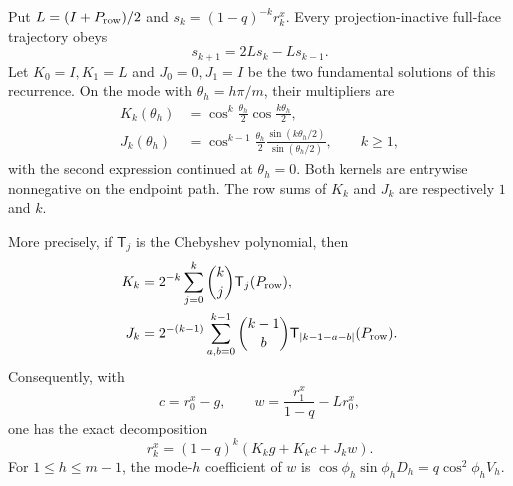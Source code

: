 \begin{lemma}
\label{lem:terminal-modal-propagators}
Put $L=(I+P_{\rm row})/2$ and
$s_k=(1-q)^{-k}r_k^x$.  Every projection-inactive full-face trajectory obeys
\begin{equation}
 s_{k+1}=2Ls_k-Ls_{k-1}.
 \label{eq:terminal-modal-scaled-recurrence}
\end{equation}
Let $K_0=I,K_1=L$ and $J_0=0,J_1=I$ be the two fundamental solutions of
this recurrence.  On the mode with $\theta_h=h\pi/m$, their multipliers are
\begin{align}
 K_k(\theta_h)&=\cos^k\frac{\theta_h}{2}
                         \cos\frac{k\theta_h}{2},
 \label{eq:terminal-modal-position-kernel}\\
 J_k(\theta_h)&=\cos^{k-1}\frac{\theta_h}{2}
 \frac{\sin(k\theta_h/2)}{\sin(\theta_h/2)},
 \qquad k\ge1,
 \label{eq:terminal-modal-velocity-kernel}
\end{align}
with the second expression continued at $\theta_h=0$.  Both kernels are
entrywise nonnegative on the endpoint path.  The row sums of $K_k$ and $J_k$
are respectively $1$ and $k$.

More precisely, if $\mathsf T_j$ is the Chebyshev polynomial, then
\begin{align}
 K_k&=2^{-k}\sum_{j=0}^k\binom{k}{j}\mathsf T_j(P_{\rm row}),
 \label{eq:terminal-modal-position-expansion}\\
 J_k&=2^{-(k-1)}\sum_{a,b=0}^{k-1}\binom{k-1}{b}
 \mathsf T_{|k-1-a-b|}(P_{\rm row}).
 \label{eq:terminal-modal-velocity-expansion}
\end{align}
Consequently, with
\begin{equation}
 c=r_0^x-g,\qquad
 w=\frac{r_1^x}{1-q}-Lr_0^x,
 \label{eq:terminal-modal-propagator-data}
\end{equation}
one has the exact decomposition
\begin{equation}
 r_k^x=(1-q)^k\left(K_kg+K_kc+J_kw\right).
 \label{eq:terminal-modal-propagator-decomposition}
\end{equation}
For $1\le h\le m-1$, the mode-$h$ coefficient of $w$ is
$\cos\phi_h\sin\phi_hD_h=q\cos^2\phi_hV_h$.
\end{lemma}

